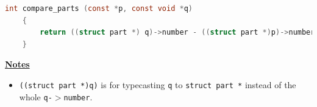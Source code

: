 \documentclass[12pt]{article}
\begin{document}
\begin{enumerate}[1.]
\begin{mdframed}
    \bigskip

\begin{lstlisting}[language=c]
    int compare_parts (const *p, const void *q)
    {
        return ((struct part *) q)->number - ((struct part *)p)->number;
    }
\end{lstlisting}

    \end{mdframed}

    \bigskip

    \underline{\textbf{Notes}}

    \begin{itemize}
        \item \texttt{((struct part *)q)} is for typecasting \texttt{q} to \texttt{struct part *}
        instead of the whole \texttt{q-$>$number}.
    \end{itemize}

\end{enumerate}
\end{document}
